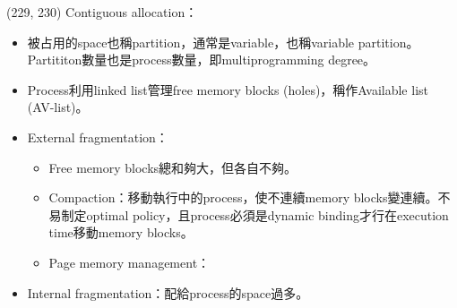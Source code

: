 \begin{theorem}{(229, 230)} Contiguous allocation：\begin{itemize}
        \item 被占用的space也稱partition，通常是variable，也稱variable partition。Partititon數量也是process數量，即multiprogramming degree。
        \item Process利用linked list管理free memory blocks (holes)，稱作Available list (AV-list)。
        \item External fragmentation：\begin{itemize}
            \item Free memory blocks總和夠大，但各自不夠。
            \item Compaction：移動執行中的process，使不連續memory blocks變連續。不易制定optimal policy，且process必須是dynamic binding才行在execution time移動memory blocks。
            \item Page memory management：
        \end{itemize}
        \item Internal fragmentation：配給process的space過多。
    \end{itemize}
\end{theorem}
